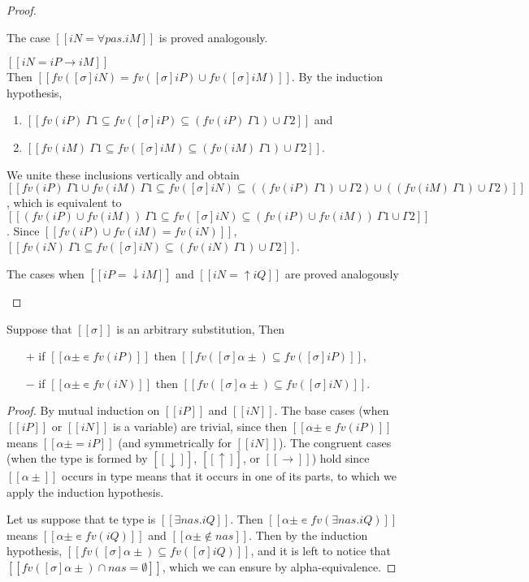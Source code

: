 \begin{proof}
\begin{caseof}
    \item The case $[[iN = ∀pas.iM]]$ is proved analogously.
    \item $[[iN = iP → iM]]$\\
      Then $[[fv([σ]iN) = fv([σ]iP) ∪ fv([σ]iM)]]$.
      By the induction hypothesis, 
      \begin{enumerate}
        \item $[[ fv(iP) \ Γ1 ⊆ fv([σ]iP) ⊆ (fv(iP) \ Γ1) ∪ Γ2]]$ and
        \item $[[ fv(iM) \ Γ1 ⊆ fv([σ]iM) ⊆ (fv(iM) \ Γ1) ∪ Γ2]]$.
      \end{enumerate}
      We unite these inclusions vertically and obtain
      $[[ fv(iP) \ Γ1 ∪ fv(iM) \ Γ1 ⊆ fv([σ]iN) ⊆ ((fv(iP) \ Γ1) ∪ Γ2) ∪ ((fv(iM) \ Γ1) ∪ Γ2)]]$,
      which is equivalent to 
      $[[ (fv(iP) ∪ fv(iM)) \ Γ1 ⊆ fv([σ]iN) ⊆ (fv(iP) ∪ fv(iM)) \ Γ1 ∪ Γ2]]$.
      Since $[[fv(iP) ∪ fv(iM) = fv(iN)]]$, 
      $[[fv(iN) \ Γ1 ⊆ fv([σ]iN) ⊆ (fv(iN) \ Γ1) ∪ Γ2]]$.
    \item The cases when $[[iP = ↓iM]]$ and $[[iN = ↑iQ]]$ are proved
      analogously
  \end{caseof}
\end{proof}

\begin{lemma}
  \label{lemma:subst-fv-image}
  Suppose that $[[σ]]$ is an arbitrary substitution, 
  Then 
  \begin{itemize}
    \item [$+$] if $[[α± ∊ fv(iP)]]$ then $[[ fv([σ]α±) ⊆ fv([σ]iP) ]]$,
    \item [$-$] if $[[α± ∊ fv(iN)]]$ then $[[ fv([σ]α±) ⊆ fv([σ]iN) ]]$.
  \end{itemize}
\end{lemma}
\begin{proof}
  By mutual induction on $[[iP]]$ and $[[iN]]$.
  The base cases (when $[[iP]]$ or $[[iN]]$ is a variable) 
  are trivial, since then $[[α± ∊ fv(iP)]]$ means 
  $[[α± = iP]]$ (and symmetrically for $[[iN]]$).
  The congruent cases 
  (when the type is formed by $[[↓]]$, $[[↑]]$, or $[[→]]$)
  hold since $[[α±]]$ occurs in type means that it occurs
  in one of its parts, to which we apply the induction hypothesis.

  Let us suppose that te type is $[[∃nas.iQ]]$.
  Then $[[α± ∊ fv(∃nas.iQ)]]$ means
  $[[α± ∊ fv(iQ)]]$ and $[[α± ∉ {nas}]]$.
  Then by the induction hypothesis, 
  $[[ fv([σ]α±) ⊆ fv([σ]iQ) ]]$,
  and it is left to notice that $[[ fv([σ]α±) ∩ {nas} = ∅ ]]$,
  which we can ensure by alpha-equivalence.
\end{proof}
